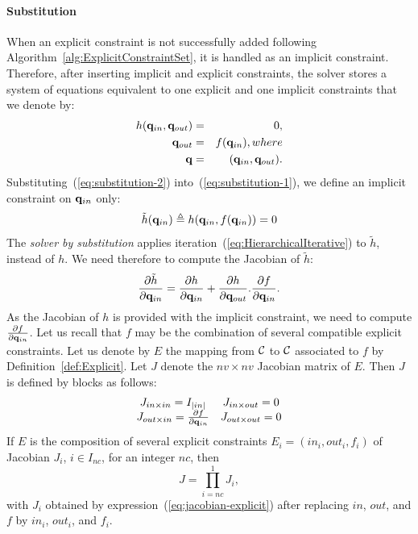 \paragraph{Substitution} When an explicit constraint is not successfully added following Algorithm~\ref{alg:ExplicitConstraintSet}, it is handled as an implicit constraint. Therefore, after inserting implicit and explicit constraints, the solver stores a system of equations equivalent to one explicit and one implicit constraints that we denote by:
\begin{eqnarray}\label{eq:substitution-1}
  h(\conf_{in},\conf_{out}) &=& 0, \\
  \label{eq:substitution-2}
  \conf_{out} &=& f(\conf_{in}), \mbox{ where }\\
  \label{eq:substitution-3}
  \conf &=& (\conf_{in},\conf_{out}).
\end{eqnarray}
Substituting~(\ref{eq:substitution-2}) into~(\ref{eq:substitution-1}), we define an implicit constraint on $\mathbf{q}_{in}$ only:
$$
\tilde{h}(\mathbf{q}_{in}) \triangleq h(\mathbf{q}_{in}, f(\mathbf{q}_{in})) = 0
$$
The \textit{solver by substitution} applies iteration~(\ref{eq:HierarchicalIterative}) to $\tilde{h}$, instead of $h$. We need therefore to compute the Jacobian of  $\tilde{h}$:
$$
\frac{\partial \tilde{h}}{\partial \mathbf{q}_{in}}  =
\frac{\partial h}{\partial \mathbf{q}_{in}} + \frac{\partial h}{\partial \mathbf{q}_{out}}.
\frac{\partial f}{\partial \mathbf{q}_{in}}.
$$
As the Jacobian of $h$ is provided with the implicit constraint, we need to compute $\frac{\partial f}{\partial \mathbf{q}_{in}}$. Let us recall that $f$ may be the combination of several compatible explicit constraints. Let us denote by $E$ the mapping from $\mathcal{C}$ to $\mathcal{C}$ associated to $f$ by Definition~\ref{def:Explicit}.
Let $J$ denote the $nv\times nv$ Jacobian matrix of $E$. Then $J$ is defined by blocks as follows:
\begin{equation}\label{eq:jacobian-explicit}
\begin{array}{cc}
  J_{{in}\times{in}} = I_{|{in}|} & J_{{in}\times{out}} = 0 \\
  J_{{out}\times{in}} = \frac{\partial f}{\partial \conf_{in}} & J_{{out}\times{out}} = 0
\end{array}
\end{equation}
If $E$ is the composition of several explicit constraints $E_i=(in_i,out_i,f_i)$ of Jacobian $J_i$, $i\in I_{nc}$, for an integer $nc$, then
\begin{equation}\label{eq:jacobian-product}
J = \prod_{i=nc}^{1} J_{i},
\end{equation}
with $J_i$ obtained by expression~(\ref{eq:jacobian-explicit}) after replacing $in$, $out$, and $f$ by $in_i$, $out_i$, and $f_i$.

